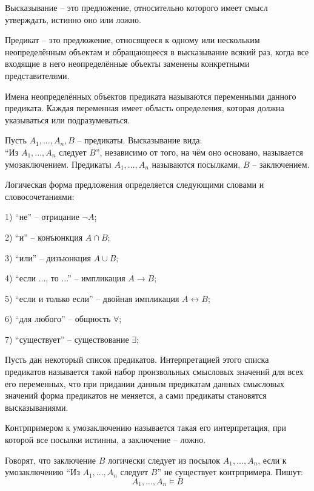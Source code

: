 
\LARGE


\LARGE

\opred
Высказывание -- это предложение, относительно которого имеет смысл утверждать, истинно оно или ложно.

\opred
Предикат -- это предложение, относящееся к одному или не\-с\-коль\-ким неопределённым объектам и обращающееся в высказывание всякий раз, когда все входящие в него неопределённые объекты заменены конкретными представителями.

\opred
Имена неопределённых объектов предиката называются переменными данного предиката.
Каждая переменная имеет область определения, которая должна указываться или подразумеваться.

\opred
Пусть $A_1, ..., A_n, B$ -- предикаты.
Высказывание вида:\\ ``Из $A_1, ..., A_n$ следует $B$'', независимо от того, на чём оно основано, называется умозаключением.
Предикаты $A_1, ..., A_n$ называются посылками, $B$ -- заключением.

\opred
Логическая форма предложения определяется следующими словами и словосочетаниями:

1) ``не'' -- отрицание $\lnot A$;

2) ``и'' -- конъюнкция $A \cap B$;

3) ``или'' -- дизъюнкция $A \cup B$;

4) ``если ..., то ...'' -- импликация  $A \to B$;

5) ``если и только если'' -- двойная импликация  $A \leftrightarrow B$;

6) ``для любого'' -- общность $\forall$;

7) ``существует'' -- существование $\exists$;

\opred

Пусть дан некоторый список предикатов.
Интерпретацией этого списка предикатов называется такой набор произвольных смысловых значений для всех его переменных, что при придании данным предикатам данных смысловых значений форма предикатов не меняется, а сами предикаты становятся высказываниями.

\opred

Контрпримером к умозаключению называется такая его интерпретация, при которой все посылки истинны, а заключение -- ложно.

\opred
Говорят, что заключение $B$ логически следует из посылок $A_1, ..., A_n$, если к умозаключению ``Из $A_1, ..., A_n$ следует $B$'' не существует контрпримера.
Пишут: $$A_1, ..., A_n \models B$$

